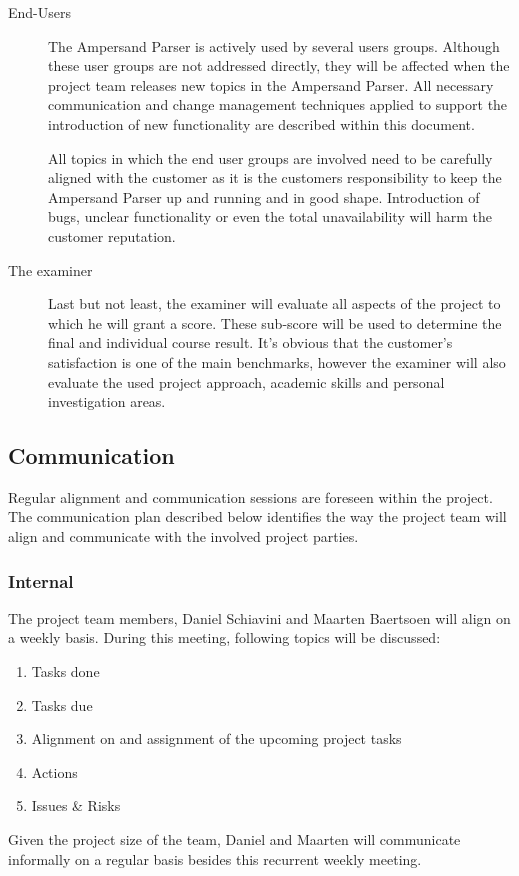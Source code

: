 \begin{description}
	\item[End-Users]
	The Ampersand Parser is actively used by several users groups.
	Although these user groups are not addressed directly, they will be affected when the project team releases new topics in the Ampersand Parser.
	All necessary communication and change management techniques applied to support the introduction of new functionality are described within this document.

	All topics in which the end user groups are involved need to be carefully aligned with the customer as it is the customers responsibility to keep the Ampersand Parser up and running and in good shape.
	Introduction of bugs, unclear functionality or even the total unavailability will harm the customer reputation.

	\item[The examiner]
	Last but not least, the examiner will evaluate all aspects of the project to which he will grant a score.
	These sub-score will be used to determine the final and individual course result.
	It's obvious that the customer's satisfaction is one of the main benchmarks, however the examiner will also evaluate the used project approach, academic skills and personal investigation areas.
\end {description}

\subsection{Communication}
Regular alignment and communication sessions are foreseen within the project.
The communication plan described below identifies the way the project team will align and communicate with the involved project parties.

\subsubsection{Internal}
The project team members, Daniel Schiavini and Maarten Baertsoen will align on a weekly basis.
During this meeting, following topics will be discussed:
\begin{enumerate}
	\item Tasks done
	\item Tasks due
	\item Alignment on and assignment of the upcoming project tasks
	\item Actions
	\item Issues \& Risks
\end {enumerate}
%
Given the project size of the team, Daniel and Maarten will communicate informally on a regular basis besides this recurrent weekly meeting.

